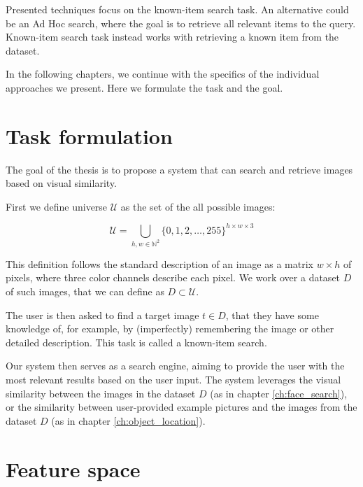 Presented techniques focus on the known-item search task. An alternative could be an Ad Hoc search, where the goal is to retrieve all relevant items to the query. Known-item search task instead works with retrieving a known item from the dataset.

In the following chapters, we continue with the specifics of the individual approaches we present. Here we formulate the task and the goal.


\section{Task formulation}
\label{s:task_formulation_preliminaries}

The goal of the thesis is to propose a system that can search and retrieve images based on visual similarity.  

First we define universe $\mathcal{U}$ as the set of the all possible images:

$$
    \mathcal{U} = \bigcup_{h,w \in \mathbb{N}^2} \{0, 1, 2, \ldots, 255 \}^{h \times w \times 3}
$$

This definition follows the standard description of an image as a matrix $w \times h$ of pixels, where three color channels describe each pixel. We work over a dataset $D$ of such images, that we can define as $D \subset \mathcal{U}$.


The user is then asked to find a target image $t \in D$, that they have some knowledge of, for example, by (imperfectly) remembering the image or other detailed description. This task is called a known-item search.

Our system then serves as a search engine, aiming to provide the user with the most relevant results based on the user input. The system leverages the visual similarity between the images in the dataset $D$ (as in chapter \ref{ch:face_search}), or the similarity between user-provided example pictures and the images from the dataset $D$ (as in chapter \ref{ch:object_location}).

\section{Feature space}

